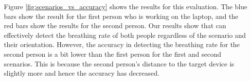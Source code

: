 Figure \ref{fig:scenarios_vs_accuracy} shows the results for this evaluation. The blue bars show the result for the first person who is working on the laptop, and the red bars show the results for the second person. Our results show that \wisneak can effectively detect the breathing rate of both people regardless of the scenario and their orientation. However, the accuracy in detecting the breathing rate for the second person is a bit lower than the first person for the first and second scenarios. This is because the second person's distance to the target device is slightly more and hence the accuracy has decreased. 





